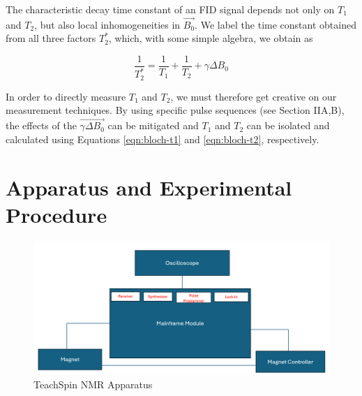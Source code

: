 \documentclass[
    floatfix,  %
    reprint,
    amsmath,
    amssymb,
    aps,
]{revtex4-2}
\begin{document}
The characteristic decay time constant of an FID signal depends not only on $T_1$ and $T_2$, but also local inhomogeneities in $\vec{B_0}$. We label the time constant obtained from all three factors $T_2^*$, which, with some simple algebra, we obtain as \cite{lab-manual}

\begin{equation}
    \frac{1}{T_2^*} = \frac{1}{T_1}+\frac{1}{T_2}+ \gamma \Delta B_0
\end{equation}

In order to directly measure $T_1$ and $T_2$, we must therefore get creative on our measurement techniques. By using specific pulse sequences (see Section IIA,B), the effects of the $\vec{\gamma \Delta B_0}$ can be mitigated and $T_1$ and $T_2$ can be isolated and calculated using Equations \ref{eqn:bloch-t1} and \ref{eqn:bloch-t2}, respectively. 


















\section{Apparatus and Experimental Procedure}

\begin{figure}
    \centering
    \includegraphics[width=.8\linewidth]{figs/Screenshot 2025-05-05 201540.png}
    \caption{TeachSpin NMR Apparatus}
    \label{apparatus}
\end{figure}
\end{document}
